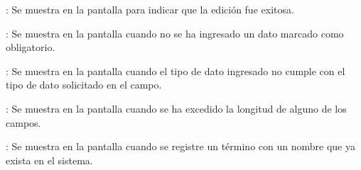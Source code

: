 \begin{Citemize}
	\item {}: Se muestra en la pantalla  para indicar que la edición fue exitosa.
	\item {}: Se muestra en la pantalla  cuando no se ha ingresado un dato marcado como obligatorio.
	\item {}: Se muestra en la pantalla  cuando el tipo de dato ingresado no cumple con el tipo de dato solicitado en el campo.
	\item {}: Se muestra en la pantalla  cuando se ha excedido la longitud de alguno de los campos.
	\item {}: Se muestra en la pantalla  cuando se registre un término con un nombre que ya exista en el sistema.
\end{Citemize}
